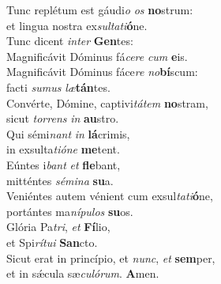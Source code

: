 \evenverse Tunc replétum est gáudi\textit{o} \textit{os} \textbf{no}strum:~\*\\
\evenverse et lingua nostra ex\textit{sul}\textit{ta}\textit{ti}\textbf{ó}ne.\\
\oddverse Tunc dicent \textit{in}\textit{ter} \textbf{Gen}tes:~\*\\
\oddverse Magnificávit Dóminus fá\textit{ce}\textit{re} \textit{cum} \textbf{e}is.\\
\evenverse Magnificávit Dóminus fáce\textit{re} \textit{no}\textbf{bí}scum:~\*\\
\evenverse facti \textit{su}\textit{mus} \textit{læ}\textbf{tán}tes.\\
\oddverse Convérte, Dómine, captivi\textit{tá}\textit{tem} \textbf{no}stram,~\*\\
\oddverse sicut \textit{tor}\textit{rens} \textit{in} \textbf{au}stro.\\
\evenverse Qui sémi\textit{nant} \textit{in} \textbf{lá}crimis,~\*\\
\evenverse in exsulta\textit{ti}\textit{ó}\textit{ne} \textbf{me}tent.\\
\oddverse Eúntes i\textit{bant} \textit{et} \textbf{fle}bant,~\*\\
\oddverse mitténtes \textit{sé}\textit{mi}\textit{na} \textbf{su}a.\\
\evenverse Veniéntes autem vénient cum exsul\textit{ta}\textit{ti}\textbf{ó}ne,~\*\\
\evenverse portántes ma\textit{ní}\textit{pu}\textit{los} \textbf{su}os.\\
\oddverse Glória Pa\textit{tri}, \textit{et} \textbf{Fí}lio,~\*\\
\oddverse et Spi\textit{rí}\textit{tu}\textit{i} \textbf{San}cto.\\
\evenverse Sicut erat in princípio, et \textit{nunc}, \textit{et} \textbf{sem}per,~\*\\
\evenverse et in sǽcula sæ\textit{cu}\textit{ló}\textit{rum}. \textbf{A}men.\\
